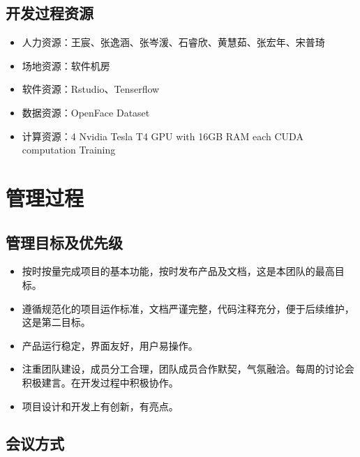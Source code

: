 \documentclass[hyperref, a4paper]{ctexart}
\providecommand{\tightlist}{%
  \setlength{\itemsep}{0pt}\setlength{\parskip}{0pt}}
\begin{document}
\hypertarget{ux5f00ux53d1ux8fc7ux7a0bux8d44ux6e90}{%
\subsection{开发过程资源}\label{ux5f00ux53d1ux8fc7ux7a0bux8d44ux6e90}}

\begin{itemize}
\tightlist
\item
  人力资源：王宸、张逸涵、张岑湲、石睿欣、黄慧茹、张宏年、宋普琦
\item
  场地资源：软件机房
\item
  软件资源：Rstudio、Tenserflow
\item
  数据资源：OpenFace Dataset
\item
  计算资源：4 Nvidia Tesla T4 GPU with 16GB RAM each CUDA computation
  Training
\end{itemize}

\hypertarget{ux7ba1ux7406ux8fc7ux7a0b}{%
\section{管理过程}\label{ux7ba1ux7406ux8fc7ux7a0b}}

\hypertarget{ux7ba1ux7406ux76eeux6807ux53caux4f18ux5148ux7ea7}{%
\subsection{管理目标及优先级}\label{ux7ba1ux7406ux76eeux6807ux53caux4f18ux5148ux7ea7}}

\begin{itemize}
\tightlist
\item
  按时按量完成项目的基本功能，按时发布产品及文档，这是本团队的最高目标。
\item
  遵循规范化的项目运作标准，文档严谨完整，代码注释充分，便于后续维护，这是第二目标。
\item
  产品运行稳定，界面友好，用户易操作。
\item
  注重团队建设，成员分工合理，团队成员合作默契，气氛融洽。每周的讨论会积极建言。在开发过程中积极协作。
\item
  项目设计和开发上有创新，有亮点。
\end{itemize}

\hypertarget{ux4f1aux8baeux65b9ux5f0f}{%
\subsection{会议方式}\label{ux4f1aux8baeux65b9ux5f0f}}
\end{document}
